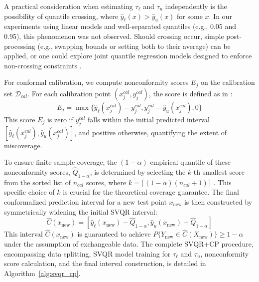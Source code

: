 \documentclass{article}
\begin{document}
A practical consideration when estimating $\tau_\ell$ and $\tau_u$ independently is the possibility of quantile crossing, where $\hat{y}_\ell(x) > \hat{y}_u(x)$ for some $x$. In our experiments using linear models and well-separated quantiles (e.g., 0.05 and 0.95), this phenomenon was not observed. Should crossing occur, simple post-processing (e.g., swapping bounds or setting both to their average) can be applied, or one could explore joint quantile regression models designed to enforce non-crossing constraints \citep{Sangnier2016JointQR, Bondell2010NoncrossingQR}.

For conformal calibration, we compute nonconformity scores $E_j$ on the calibration set $\mathcal{D}_{cal}$. For each calibration point $(x_j^{cal}, y_j^{cal})$, the score is defined as in \citet{Romano2019ConformalizedQR}:
\begin{equation}
\label{eq:nonconformity_score_updated}
E_j = \max\{ \hat{y}_{\ell}(x_j^{cal}) - y_j^{cal}, y_j^{cal} - \hat{y}_{u}(x_j^{cal}), 0 \}
\end{equation}
This score $E_j$ is zero if $y_j^{cal}$ falls within the initial predicted interval $[\hat{y}_{\ell}(x_j^{cal}), \hat{y}_{u}(x_j^{cal})]$, and positive otherwise, quantifying the extent of miscoverage.

To ensure finite-sample coverage, the $(1-\alpha)$ empirical quantile of these nonconformity scores, $\hat{Q}_{1-\alpha}$, is determined by selecting the $k$-th smallest score from the sorted list of $n_{cal}$ scores, where $k = \lceil (1-\alpha)(n_{cal}+1) \rceil$ \citep{Lei2018DistributionFreePC}. This specific choice of $k$ is crucial for the theoretical coverage guarantee. The final conformalized prediction interval for a new test point $x_{\text{new}}$ is then constructed by symmetrically widening the initial SVQR interval:
\begin{equation}
\label{eq:conformal_interval_updated}
\hat{C}(x_{\text{new}}) = [\hat{y}_{\ell}(x_{\text{new}}) - \hat{Q}_{1-\alpha}, \hat{y}_{u}(x_{\text{new}}) + \hat{Q}_{1-\alpha}]
\end{equation}
This interval $\hat{C}(x_{\text{new}})$ is guaranteed to achieve $P\{Y_{\text{new}} \in \hat{C}(X_{\text{new}})\} \ge 1-\alpha$ under the assumption of exchangeable data. The complete SVQR+CP procedure, encompassing data splitting, SVQR model training for $\tau_\ell$ and $\tau_u$, nonconformity score calculation, and the final interval construction, is detailed in Algorithm~\ref{alg:svqr_cp}.
\end{document}
